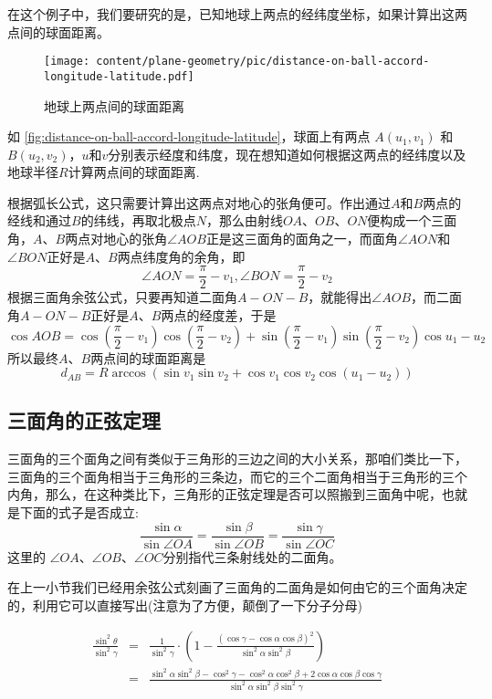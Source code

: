 \begin{example}[根据经纬度计算地球上两点间的(球面)距离]
  在这个例子中，我们要研究的是，已知地球上两点的经纬度坐标，如果计算出这两点间的球面距离。

  \begin{figure}[htbp]
\centering
\texttt{[image: content/plane-geometry/pic/distance-on-ball-accord-longitude-latitude.pdf]}
\caption{地球上两点间的球面距离}
\label{fig:distance-on-ball-accord-longitude-latitude}
\end{figure}

如 \autoref{fig:distance-on-ball-accord-longitude-latitude}，球面上有两点 $A(u_1, v_1)$ 和 $B(u_2,v_2)$，$u$和$v$分别表示经度和纬度，现在想知道如何根据这两点的经纬度以及地球半径$R$计算两点间的球面距离.

根据弧长公式，这只需要计算出这两点对地心的张角便可。作出通过$A$和$B$两点的经线和通过$B$的纬线，再取北极点$N$，那么由射线$OA$、$OB$、$ON$便构成一个三面角，$A$、$B$两点对地心的张角$\angle AOB$正是这三面角的面角之一，而面角$\angle AON$和$\angle BON$正好是$A$、$B$两点纬度角的余角，即
\[ \angle AON = \frac{\pi}{2}-v_1, \angle BON = \frac{\pi}{2}-v_2 \]
根据三面角余弦公式，只要再知道二面角$A-ON-B$，就能得出$\angle AOB$，而二面角$A-ON-B$正好是$A、B$两点的经度差，于是
\[ \cos{AOB} = \cos{\left(\frac{\pi}{2}-v_1\right)}\cos{\left(\frac{\pi}{2}-v_2\right)}+\sin{\left( \frac{\pi}{2}-v_1 \right)}\sin{\left(\frac{\pi}{2}-v_2\right)}\cos{u_1-u_2} \]
所以最终$A$、$B$两点间的球面距离是
\[ d_{AB} = R\arccos(\sin{v_1}\sin{v_2}+\cos{v_1}\cos{v_2}\cos{(u_1-u_2)}) \]
\end{example}

\subsection{三面角的正弦定理}
\label{sec:sine-thoream-of-trihedral-angle}

三面角的三个面角之间有类似于三角形的三边之间的大小关系，那咱们类比一下，三面角的三个面角相当于三角形的三条边，而它的三个二面角相当于三角形的三个内角，那么，在这种类比下，三角形的正弦定理是否可以照搬到三面角中呢，也就是下面的式子是否成立:
\[ \frac{\sin{\alpha}}{\sin{\angle OA}} = \frac{\sin{\beta}}{\sin{\angle OB}} = \frac{\sin{\gamma}}{\sin{\angle OC}} \]
这里的 $\angle OA$、$\angle OB$、$\angle OC$分别指代三条射线处的二面角。

在上一小节我们已经用余弦公式刻画了三面角的二面角是如何由它的三个面角决定的，利用它可以直接写出(注意为了方便，颠倒了一下分子分母)

\begin{eqnarray*}
  \frac{\sin^{2}{\theta}}{\sin^2{\gamma}} & = & \frac{1}{\sin^2{\gamma}} \cdot \left( 1-\frac{(\cos{\gamma}-\cos{\alpha}\cos{\beta})^2}{\sin^2{\alpha}\sin^2{\beta}} \right) \\
  & = & \frac{\sin^2{\alpha}\sin^2{\beta}-\cos^2{\gamma}-\cos^2{\alpha}\cos^2{\beta}+2\cos{\alpha}\cos{\beta}\cos{\gamma}}{\sin^2{\alpha}\sin^2{\beta}\sin^2{\gamma}} 
\end{eqnarray*}

